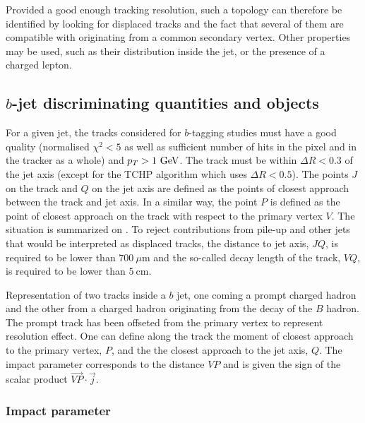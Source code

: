     Provided a good enough tracking resolution, such a topology can therefore be identified
    by looking for displaced tracks and the fact that several of them are compatible with
    originating from a common secondary vertex. Other properties may be used, such as their
    distribution inside the jet, or the presence of a charged lepton.

    \subsection{$b$-jet discriminating quantities and objects}

    For a given jet, the tracks considered for $b$-tagging studies must have
    a good quality (normalised $\chi^2 < 5$ as well as sufficient number of hits in the
    pixel and in the tracker as a whole) and $p_T > 1~\text{GeV}$. The track must be within
    $\Delta R < 0.3$ of the jet axis (except for the TCHP algorithm which uses $\Delta R < 0.5$).
    The points $J$ on the track and $Q$ on the jet axis are defined as the points of closest
    approach between the track and jet axis. In a similar way, the point $P$ is defined
    as the point of closest approach on the track with respect to the primary vertex $V$.
    The situation is summarized on . To reject
    contributions from pile-up and other jets that would be interpreted as displaced
    tracks, the distance to jet axis, $JQ$, is required to be lower than $700~{\mu\text{m}}$
    and the so-called decay length of the track, $VQ$, is required to be lower than
    $5~\text{cm}$.

                 {Representation of two tracks inside a $b$ jet, one coming a prompt charged
                 hadron and the other from a charged hadron originating from the decay of
                 the $B$ hadron. The prompt track has been offseted from the primary vertex
                 to represent resolution effect. One can define along the track the moment
                 of closest approach to the primary vertex, $P$, and the the closest approach
                 to the jet axis, $Q$. The impact parameter corresponds to the distance $VP$
                 and is given the sign of the scalar product $\vec{VP} \cdot \vec{j}$.}

    \subsubsection{Impact parameter}

